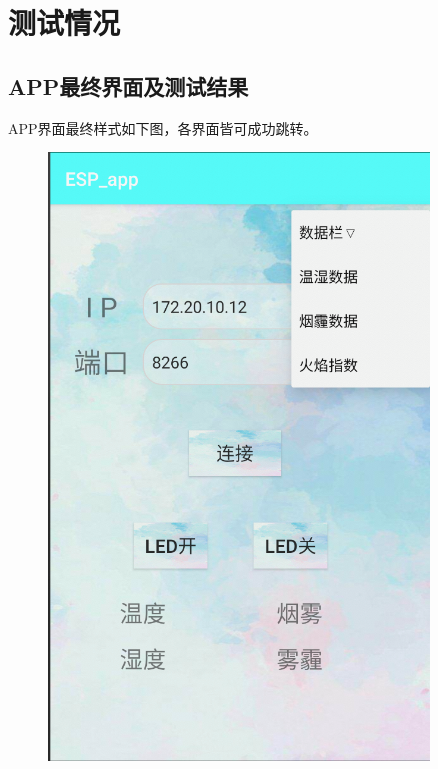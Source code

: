 
\chapter{测试情况}

\section{APP最终界面及测试结果}

APP界面最终样式如下图，各界面皆可成功跳转。

\begin{figure}[h]
    \centering
    \begin{minipage}{0.3\textwidth}
        \centering
        \includegraphics[width=0.9\textwidth]{figures/test/1}   
    \end{minipage}

\end{figure}
